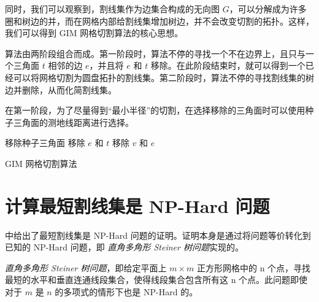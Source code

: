 同时，我们可以观察到，割线集作为边集合构成的无向图 $ G $，可以分解成为许多圈和树边的并，而在网格内部给割线集增加树边，并不会改变切割的拓扑。这样，我们可以得到 GIM 网格切割算法的核心思想。

算法由两阶段组合而成。第一阶段时，算法不停的寻找一个不在边界上，且只与一个三角面 $ t $ 相邻的边 $ e $，并且将 $ e $ 和 $ t $ 移除。在此阶段结束时，就可以得到一个已经可以将网格切割为圆盘拓扑的割线集。第二阶段时，算法不停的寻找割线集的树边并删除，从而化简割线集。

在第一阶段，为了尽量得到“最小半径”的切割，在选择移除的三角面时可以使用种子三角面的测地线距离进行选择。

\begin{algorithm}[h]
    \SetAlgoLined

    移除种子三角面\;
     {
      移除 $ e $ 和 $ t $\;
    }
     {
      移除 $ v $ 和 $ e $\;
    }
    \caption{GIM 网格切割算法}
\end{algorithm}

\section{计算最短割线集是 NP-Hard 问题}

\citet{Erickson2002} 中给出了最短割线集是 NP-Hard 问题的证明。证明本身是通过将问题等价转化到已知的 NP-Hard 问题，即 \textit{直角多角形 Steiner 树问题}实现的。

\textit{直角多角形 Steiner 树问题}，即给定平面上 $ m \times m $ 正方形网格中的 n 个点，寻找最短的水平和垂直连通线段集合，使得线段集合包含所有这 n 个点。此问题即使对于 $ m $ 是 $ n $ 的多项式的情形下也是 NP-Hard 的。
